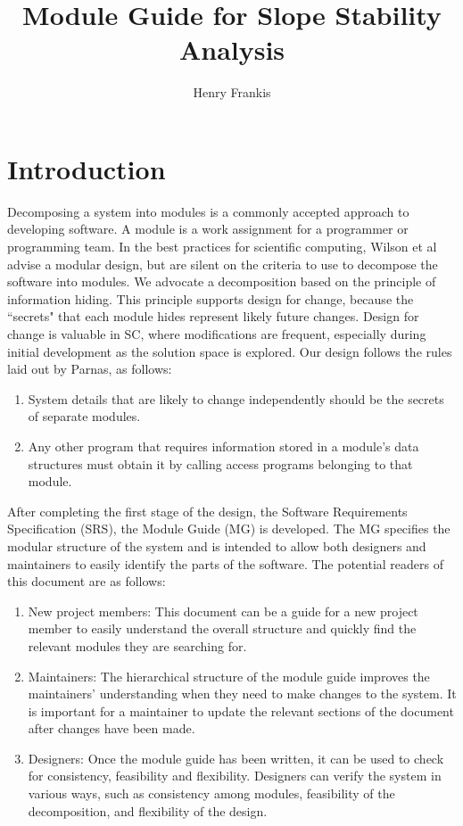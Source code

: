 \documentclass[12pt]{article}
\title{Module Guide for Slope Stability Analysis}
\author{Henry Frankis}
\begin{document}
\maketitle
\tableofcontents
\newpage
\section{Introduction}
\label{Sec:Intr}
Decomposing a system into modules is a commonly accepted approach to developing software.  A module is a work assignment for a programmer or programming team. In the best practices for scientific computing, Wilson et al advise a modular design, but are silent on the criteria to use to decompose the software into modules.  We advocate a decomposition based on the principle of information hiding. This principle supports design for change, because the ``secrets" that each module hides represent likely future changes.  Design for change is valuable in SC, where modifications are frequent, especially during initial development as the solution space is explored.
Our design follows the rules laid out by Parnas, as follows:
\begin{enumerate}
\item{System details that are likely to change independently should be the secrets of separate modules.}
\item{Any other program that requires information stored in a module's data structures must obtain it by calling access programs belonging to that module.}
\end{enumerate}
After completing the first stage of the design, the Software Requirements Specification (SRS), the Module Guide (MG) is developed. The MG specifies the modular structure of the system and is intended to allow both designers and maintainers to easily identify the parts of the software.  The potential readers of this document are as follows:
\begin{enumerate}
\item{New project members: This document can be a guide for a new project member to easily understand the overall structure and quickly find the relevant modules they are searching for.}
\item{Maintainers: The hierarchical structure of the module guide improves the maintainers' understanding when they need to make changes to the system. It is important for a maintainer to update the relevant sections of the document after changes have been made.}
\item{Designers: Once the module guide has been written, it can be used to check for consistency, feasibility and flexibility. Designers can verify the system in various ways, such as consistency among modules, feasibility of the decomposition, and flexibility of the design.}
\end{enumerate}
\end{document}
